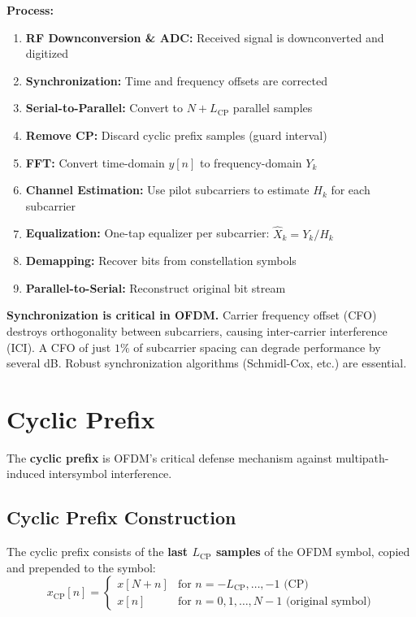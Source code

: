 \textbf{Process:}
\begin{enumerate}
\item \textbf{RF Downconversion \& ADC:} Received signal is downconverted and digitized
\item \textbf{Synchronization:} Time and frequency offsets are corrected
\item \textbf{Serial-to-Parallel:} Convert to $N+L_{\mathrm{CP}}$ parallel samples
\item \textbf{Remove CP:} Discard cyclic prefix samples (guard interval)
\item \textbf{FFT:} Convert time-domain $y[n]$ to frequency-domain $Y_k$
\item \textbf{Channel Estimation:} Use pilot subcarriers to estimate $H_k$ for each subcarrier
\item \textbf{Equalization:} One-tap equalizer per subcarrier: $\hat{X}_k = Y_k / H_k$
\item \textbf{Demapping:} Recover bits from constellation symbols
\item \textbf{Parallel-to-Serial:} Reconstruct original bit stream
\end{enumerate}

\begin{warningbox}
\textbf{Synchronization is critical in OFDM.} Carrier frequency offset (CFO) destroys orthogonality between subcarriers, causing inter-carrier interference (ICI). A CFO of just $1\%$ of subcarrier spacing can degrade performance by several dB. Robust synchronization algorithms (Schmidl-Cox, etc.) are essential.
\end{warningbox}

\section{Cyclic Prefix}

The \textbf{cyclic prefix} is OFDM's critical defense mechanism against multipath-induced intersymbol interference.

\subsection{Cyclic Prefix Construction}

The cyclic prefix consists of the \textbf{last $L_{\mathrm{CP}}$ samples} of the OFDM symbol, copied and prepended to the symbol:
\begin{equation}
x_{\mathrm{CP}}[n] = \begin{cases}
x[N + n] & \text{for } n = -L_{\mathrm{CP}}, \ldots, -1 \text{ (CP)} \\
x[n] & \text{for } n = 0, 1, \ldots, N-1 \text{ (original symbol)}
\end{cases}
\end{equation}

